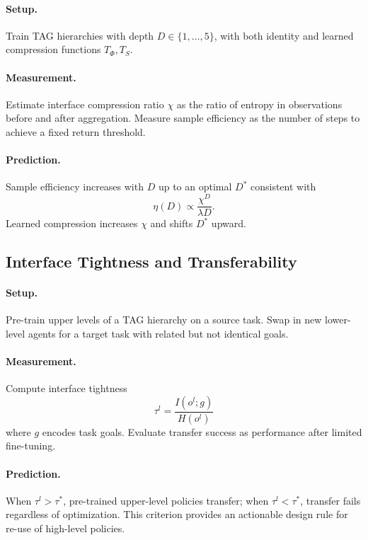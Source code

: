 \documentclass[11pt,a4paper]{article}
\begin{document}
\paragraph{Setup.}
Train TAG hierarchies with depth $D \in \{1,\dots,5\}$, with both identity and
learned compression functions $T_\Phi, T_S$.

\paragraph{Measurement.}
Estimate interface compression ratio $\chi$ as the ratio of entropy in
observations before and after aggregation. Measure sample efficiency as the
number of steps to achieve a fixed return threshold.

\paragraph{Prediction.}
Sample efficiency increases with $D$ up to an optimal $D^\ast$ consistent with
\[
\eta(D) \propto \frac{\chi^D}{\lambda D}.
\]
Learned compression increases $\chi$ and shifts $D^\ast$ upward.

\subsection{Interface Tightness and Transferability}

\paragraph{Setup.}
Pre-train upper levels of a TAG hierarchy on a source task. Swap in new
lower-level agents for a target task with related but not identical goals.

\paragraph{Measurement.}
Compute interface tightness
\[
\tau^l = \frac{I(o^l; g)}{H(o^l)}
\]
where $g$ encodes task goals. Evaluate transfer success as performance after
limited fine-tuning.

\paragraph{Prediction.}
When $\tau^l > \tau^\ast$, pre-trained upper-level policies transfer; when
$\tau^l < \tau^\ast$, transfer fails regardless of optimization. This criterion
provides an actionable design rule for re-use of high-level policies.
\end{document}
